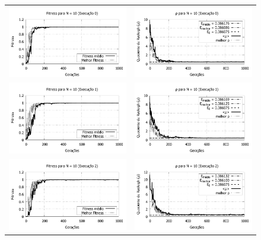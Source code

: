 	\begin{figure}[phtb]
	\centering
  \begin{tabular}{@{}cc@{}}
    \includegraphics[width=.40\textwidth]{figs/resultados/fitnessEL/N-10_E-0_fitness-extendido.pdf} &
    \includegraphics[width=.40\textwidth]{figs/resultados/fitnessEL/N-10_E-0_rho_extendido.pdf}   \\
		\includegraphics[width=.40\textwidth]{figs/resultados/fitnessEL/N-10_E-1_fitness-extendido.pdf} &
    \includegraphics[width=.40\textwidth]{figs/resultados/fitnessEL/N-10_E-1_rho_extendido.pdf}   \\
		\includegraphics[width=.40\textwidth]{figs/resultados/fitnessEL/N-10_E-2_fitness-extendido.pdf} &
    \includegraphics[width=.40\textwidth]{figs/resultados/fitnessEL/N-10_E-2_rho_extendido.pdf}   \\

\end{tabular}
\end{figure}

